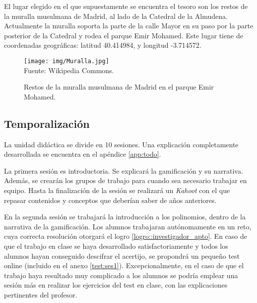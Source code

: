 El lugar elegido en el que supuestamente se encuentra el tesoro son los restos de la muralla musulmana de Madrid, al lado de la Catedral de la Almudena. 
%
Actualmente la muralla soporta la parte de la calle Mayor en su paso por la parte posterior de la Catedral y rodea el parque Emir Mohamed.
%
Este lugar tiene de coordenadas geográficas: latitud 40.414984, y longitud -3.714572.
%
\label{defn:coordenadas}

\begin{figure}[hbtp]
\centering
\caption{Restos de la muralla musulmana de Madrid en el parque Emir Mohamed.}
\label{img:MurallaMusulmana}
\texttt{[image: img/Muralla.jpg]}
\\
\small{Fuente: Wikipedia Commons.}
\end{figure}
\FloatBarrier




\subsection{Temporalización}

La unidad didáctica se divide en 10 sesiones. 
%
Una explicación completamente desarrollada se encuentra en el apéndice \ref{app:todo}.


\label{ResumenSesion1}
%
La primera sesión es introductoria.
%
Se explicará la gamificación y su narrativa. 
%
Además, se crearán los grupos de trabajo para cuando sea necesario trabajar en equipo.
%
Hasta la finalización de la sesión se realizará un \textit{Kahoot} con el que repasar contenidos y conceptos que deberían saber de años anteriores.

\label{ResumenSesion2}
%
En la segunda sesión se trabajará la introducción a los polinomios, dentro de la narrativa de la gamificación. 
%
Los alumnos trabajaran autónomamente en un reto, cuya correcta resolución otorgará el logro \ref{logro::investigador_apto}.
%
En caso de que el trabajo en clase se haya desarrollado satisfactoriamente y todos los alumnos hayan conseguido descifrar el acertijo, se propondrá un pequeño test online (incluido en el anexo \ref{test:ses1}).
%
Excepcionalmente, en el caso de que el trabajo haya resultado muy complicado a los alumnos se podría emplear una sesión más en realizar los ejercicios del test en clase, con las explicaciones pertinentes del profesor.

